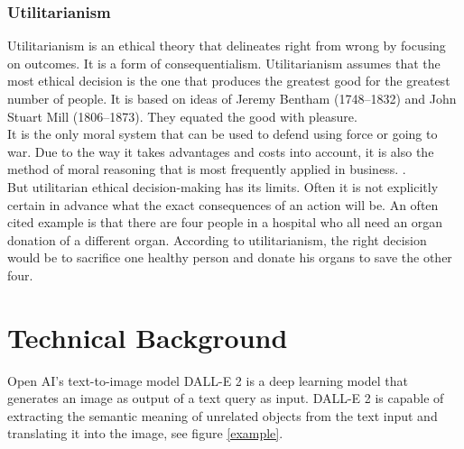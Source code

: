 \documentclass[11pt]{article}
\begin{document}
\subsubsection{Utilitarianism}
Utilitarianism is an ethical theory that delineates right from wrong by focusing on outcomes. It is a form of consequentialism.
Utilitarianism assumes that the most ethical decision is the one that produces the greatest good for the greatest number of people. It is based on ideas of Jeremy Bentham (1748--1832) and John Stuart Mill (1806--1873). They equated the good with pleasure.\\
It is the only moral system that can be used to defend using force or going to war. Due to the way it takes advantages and costs into account, it is also the method of moral reasoning that is most frequently applied in business. \cite{EthicsUnwrapped}. \\
But utilitarian ethical decision-making has its limits. Often it is not explicitly certain in advance what the exact consequences of an action will be. 
An often cited example is that there are four people in a hospital who all need an organ donation of a different organ. According to utilitarianism, the right decision would be to sacrifice one healthy person and donate his organs to save the other four.

\section{Technical Background}
Open AI's text-to-image model DALL-E 2 is a deep learning model that generates an image as output of a text query as input. DALL-E 2 is capable of extracting the semantic meaning of unrelated objects from the text input and translating it into the image, see figure \ref{example}.\\
\end{document}
